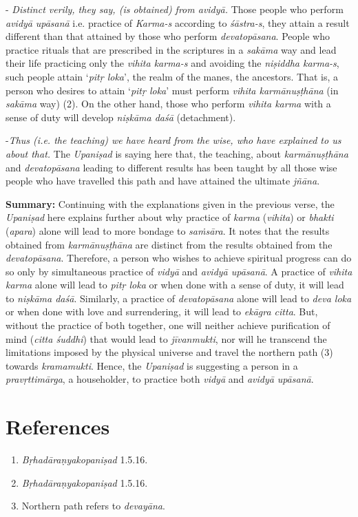  - \emph{Distinct verily, they say, (is obtained) from avidyā.} Those people who perform \emph{avidyā} \emph{upāsanā} i.e. practice of \emph{Karma-s} according to \emph{śāstra-s}, they attain a result different than that attained by those who perform \emph{devatopāsana}. People who practice rituals that are prescribed in the scriptures in a \emph{sakāma} way and lead their life practicing only the \emph{vihita karma-s} and avoiding the \emph{niṣiddha karma-s}, such people attain `\emph{pitṛ loka}', the realm of the manes, the ancestors. That is, a person who desires to attain `\emph{pitṛ loka}' must perform \emph{vihita karmānuṣṭhāna} (in \emph{sakāma} way) (2). On the other hand, those who perform \emph{vihita karma} with a sense of duty will develop \emph{niṣkāma daśā} (detachment).

-\emph{Thus (i.e. the teaching) we have heard from the wise, who have explained to us about that.} The \emph{Upaniṣad} is saying here that, the teaching, about \emph{karmānuṣṭhāna} and \emph{devatopāsana} leading to different results has been taught by all those wise people who have travelled this path and have attained the ultimate \emph{jñāna}.

\textbf{Summary:} Continuing with the explanations given in the previous verse, the \emph{Upaniṣad} here explains further about why practice of \emph{karma} (\emph{vihita}) or \emph{bhakti} (\emph{apara}) alone will lead to more bondage to \emph{saṁsāra}. It notes that the results obtained from \emph{karmānuṣṭhāna} are distinct from the results obtained from the \emph{devatopāsana}. Therefore, a person who wishes to achieve spiritual progress can do so only by simultaneous practice of \emph{vidyā} and \emph{avidyā upāsanā}. A practice of \emph{vihita karma} alone will lead to \emph{pitṛ loka} or when done with a sense of duty, it will lead to \emph{niṣkāma daśā}. Similarly, a practice of \emph{devatopāsana} alone will lead to \emph{deva loka} or when done with love and surrendering, it will lead to \emph{ekāgra citta}. But, without the practice of both together, one will neither achieve purification of mind (\emph{citta śuddhi}) that would lead to \emph{jīvanmukti}, nor will he transcend the limitations imposed by the physical universe and travel the northern path (3) towards \emph{kramamukti}. Hence, the \emph{Upaniṣad} is suggesting a person in a \emph{pravṛttimārga}, a householder, to practice both \emph{vidyā} and \emph{avidyā} \emph{upāsanā}.

\section*{References}

\begin{enumerate}
\item
  \emph{Bṛhadāraṇyakopaniṣad} 1.5.16.
\item
  \emph{Bṛhadāraṇyakopaniṣad} 1.5.16.
\item
  Northern path refers to \emph{devayāna}.
\end{enumerate}


